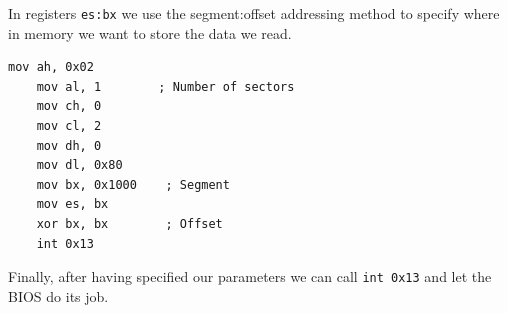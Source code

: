 In registers \texttt{es:bx} we use the segment:offset addressing method to specify where in memory we want
to store the data we read.

\begin{lstlisting}[caption={Assembly to load the kernel}]
    mov ah, 0x02
    mov al, 1        ; Number of sectors
    mov ch, 0
    mov cl, 2
    mov dh, 0
    mov dl, 0x80
    mov bx, 0x1000    ; Segment
    mov es, bx
    xor bx, bx        ; Offset
    int 0x13
\end{lstlisting}

Finally, after having specified our parameters we can call \texttt{int 0x13} and let the BIOS do its job.